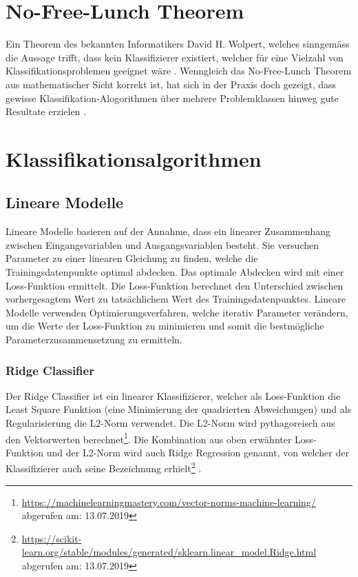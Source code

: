 \section{No-Free-Lunch Theorem}\label{sec:nofreelunch}
Ein Theorem des bekannten Informatikers David H. Wolpert, welches sinngemäss die Aussage trifft, dass kein Klassifizierer existiert, welcher für eine Vielzahl von Klassifikationsproblemen geeignet wäre \cite[p. 1341-1390]{Wolpert1996TheLO}.
Wenngleich das No-Free-Lunch Theorem aus mathematischer Sicht korrekt ist, hat sich in der Praxis doch gezeigt, dass gewisse Klassifikation-Alogorithmen über mehrere Problemklassen hinweg gute Resultate erzielen \cite{fernandez-delgado2014}.
\section{Klassifikationsalgorithmen}\label{sec:algos}
\subsection{Lineare Modelle}
Lineare Modelle basieren auf der Annahme, dass ein linearer Zusammenhang zwischen Eingangsvariablen und Ausgangsvariablen besteht.
Sie versuchen Parameter zu einer linearen Gleichung zu finden, welche die Trainingsdatenpunkte optimal abdecken.
Das optimale Abdecken wird mit einer Loss-Funktion ermittelt.
Die Loss-Funktion berechnet den Unterschied zwischen vorhergesagtem Wert zu tatsächlichem Wert des Trainingsdatenpunktes.
Lineare Modelle verwenden Optimierungsverfahren, welche iterativ Parameter verändern, um die Werte der Loss-Funktion zu minimieren und somit die bestmögliche Parameterzusammensetzung zu ermitteln.\cite{Frick-Wuersch}
\subsubsection{Ridge Classifier}
Der Ridge Classifier ist ein linearer Klassifizierer, welcher als Loss-Funktion die \glqq Least Square\grqq{} Funktion (eine Minimierung der quadrierten Abweichungen) und als Regularisierung die L2-Norm verwendet. Die L2-Norm wird pythagoreisch aus den Vektorwerten berechnet\footnote{\url{https://machinelearningmastery.com/vector-norms-machine-learning/} abgerufen am: 13.07.2019}.
Die Kombination aus oben erwähnter Loss-Funktion und der L2-Norm wird auch \glqq Ridge Regression\grqq{} genannt, von welcher der Klassifizierer auch seine Bezeichnung erhielt\footnote{\url{https://scikit-learn.org/stable/modules/generated/sklearn.linear_model.Ridge.html} abgerufen am: 13.07.2019} \cite{scikit-learn}.
